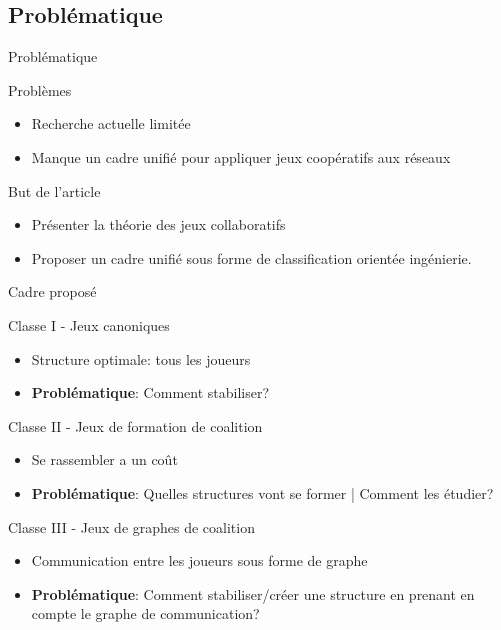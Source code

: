 \documentclass{isimabeamer}
\begin{document}
\subsection{Problématique}
\begin{frame}{Problématique}
\begin{block}{Problèmes}
\begin{itemize}
    \item Recherche actuelle limitée 
    \item Manque un cadre unifié pour appliquer jeux coopératifs aux réseaux 
\end{itemize}
\end{block}

\begin{block}{But de l'article}
\begin{itemize}
    \item Présenter la théorie des jeux collaboratifs 
    \item Proposer un cadre unifié sous forme de classification orientée ingénierie.
\end{itemize}
\end{block}
\end{frame}


\begin{frame}{Cadre proposé}
\begin{block}{Classe I - Jeux canoniques}
\begin{itemize}
    \item Structure optimale: tous les joueurs
    \item \textbf{Problématique}: Comment stabiliser?  
\end{itemize}
\end{block}

\begin{block}{Classe II - Jeux de formation de coalition}
\begin{itemize}
    \item Se rassembler a un coût  
    \item \textbf{Problématique}: Quelles structures vont se former | Comment les étudier?
\end{itemize}
\end{block}

\begin{block}{Classe III - Jeux de graphes de coalition}
\begin{itemize}
    \item Communication entre les joueurs sous forme de graphe
    \item \textbf{Problématique}: Comment stabiliser/créer une structure en prenant en compte le graphe de communication?
\end{itemize}
\end{block}

\end{frame}
\end{document}
